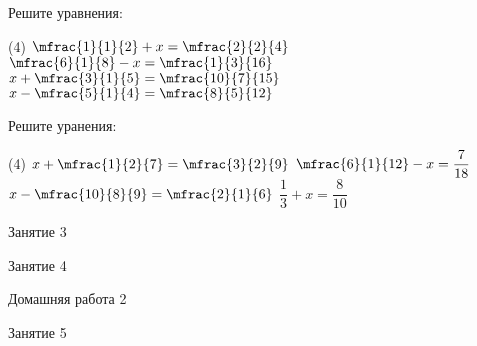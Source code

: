 \begin{homework}[number=1]
	\begin{listofex}
		\item Решите уравнения:
		\begin{tasks}(4)
			\task \( \mfrac{1}{1}{2}+x=\mfrac{2}{2}{4} \)
			\task \( \mfrac{6}{1}{8}-x=\mfrac{1}{3}{16} \)
			\task \( x+\mfrac{3}{1}{5}=\mfrac{10}{7}{15} \)
			\task \( x-\mfrac{5}{1}{4}=\mfrac{8}{5}{12} \)
		\end{tasks}
		\item Решите уранения:
		\begin{tasks}(4)
			\task \( x+\mfrac{1}{2}{7}=\mfrac{3}{2}{9} \)
			\task \( \mfrac{6}{1}{12}-x=\dfrac{7}{18} \)
			\task \( x-\mfrac{10}{8}{9}=\mfrac{2}{1}{6} \)
			\task \( \dfrac{1}{3}+x=\dfrac{8}{10} \)
		\end{tasks}
	\end{listofex}
\end{homework}

\begin{class}[number=3]
	\begin{listofex}
		\item Занятие 3 
	\end{listofex}
\end{class}

\begin{class}[number=4]
	\begin{listofex}
		\item Занятие 4
	\end{listofex}
\end{class}

\begin{homework}[number=2]
	\begin{listofex}
		\item Домашняя работа 2
	\end{listofex}
\end{homework}

\begin{class}[number=5]
	\begin{listofex}
		\item Занятие 5
	\end{listofex}
	\end{class}
	

